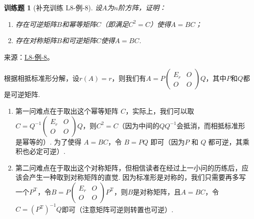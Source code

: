 \documentclass[12pt,fontset=fandol]{ctexart}
\newtheorem{exercise}{训练题}[section]
\begin{document}
\begin{exercise}[补充训练 L8-例-8]\label{prob:L8-例-8}
设$A$为$n$阶方阵，证明：
    \begin{enumerate}
        \item 存在可逆矩阵$B$和幂等矩阵$C$（即满足$C^2=C$）使得$A=BC$；
        \item 存在对称矩阵$B$和可逆矩阵$C$使得$A=BC$.
    \end{enumerate}
\end{exercise}
\noindent 来源：\href{https://github.com/yhwu-is/Linear-Algebra-Left-Undone/blob/new/%E8%AE%B2%E4%B9%89/%E4%B8%93%E9%A2%98/8%20%E7%9B%B8%E6%8A%B5%E6%A0%87%E5%87%86%E5%BD%A2.tex}{L8-例-8}。
\begin{solve}
根据相抵标准形分解，设$r(A)=r$，则我们有$A=P\begin{pmatrix}
            E_r & O \\ O & O
        \end{pmatrix}Q$，其中$P$和$Q$都是可逆矩阵.
    \begin{enumerate}
        \item 第一问难点在于取出这个幂等矩阵 $C$，实际上，我们可以取$C=Q^{-1}\begin{pmatrix}
                      E_r & O \\ O & O
                  \end{pmatrix}Q$，则$C^2=C$（因为中间的$QQ^{-1}$会抵消，而相抵标准形是幂等的）. 为了使得 $A = BC$，令 $B = PQ$ 即可（因为$P$ 和 $Q$ 都可逆，其乘积也必定可逆）.

        \item 第二问难点在于取出这个对称矩阵，但相信读者在经过上一小问的历练后，应该会产生一种取到对称矩阵的直觉. 因为标准形是对称的，我们只需要再多写一个$P^\mathrm{T}$，令$B=P\begin{pmatrix}
                      E_r & O \\ O & O
                  \end{pmatrix}P^\mathrm{T}$，则$B$是对称矩阵，且$A=BC$，令$C=(P^\mathrm{T})^{-1}Q$即可（注意矩阵可逆则转置也可逆）.
    \end{enumerate}
\end{solve}
\end{document}
